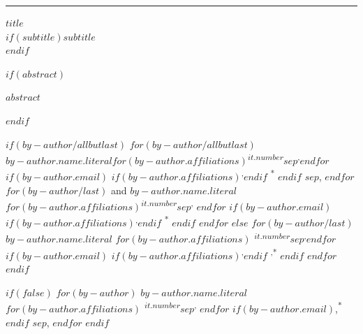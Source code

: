 
\raggedleft %
\thispagestyle{empty}
\rule{1pt}{\textheight} %
\hspace{0.05\textwidth} %
\begin{minipage}[b][\textheight][s]{0.85\textwidth}

\raggedright
{\color{bluegray}\Large\bfseries\nohyphens{$title$}}\\[1.25\baselineskip]
$if(subtitle)${\color{bluegray}\normalsize\textit{$subtitle$}}\\[4\baselineskip]$endif$

$if(abstract)$%
\begin{flushright}%
{{$abstract$}}\\[4\baselineskip]%
\end{flushright}%
$endif$

$if(by-author/allbutlast)$
$for(by-author/allbutlast)$
 {\large{$by-author.name.literal$}}$for(by-author.affiliations)${\textsuperscript{$it.number$}}$sep$\textsuperscript{,}$endfor$%
$if(by-author.email)$%
$if(by-author.affiliations)$\textsuperscript{,}$endif$%
{\textsuperscript{*}}%
$endif$%
$sep$, 
$endfor$
$for(by-author/last)$%
{ and \large{$by-author.name.literal$}}%
$for(by-author.affiliations)${\textsuperscript{$it.number$}}$sep$\textsuperscript{,}%
$endfor$%
$if(by-author.email)$%
$if(by-author.affiliations)$\textsuperscript{,}$endif$%
{\textsuperscript{*}}%
$endif$%
$endfor$
$else$
$for(by-author/last)$%
{\large{$by-author.name.literal$}}%
$for(by-author.affiliations)$%
{\textsuperscript{$it.number$}}$sep$\textsuperscript{,}$endfor$%
$if(by-author.email)$%
$if(by-author.affiliations)$\textsuperscript{,}$endif$%
{\textsuperscript{,*}}%
$endif$%
$endfor$
$endif$

$if(false)$%
$for(by-author)$%
{$by-author.name.literal$}%
$for(by-author.affiliations)$%
{\textsuperscript{$it.number$}}$sep${\textsuperscript{,}}%
$endfor$%
$if(by-author.email)$,{\textsuperscript{*}}%
$endif$%
$sep$, %
$endfor$%
$endif$

\vspace{2\baselineskip} 


\end{minipage}
